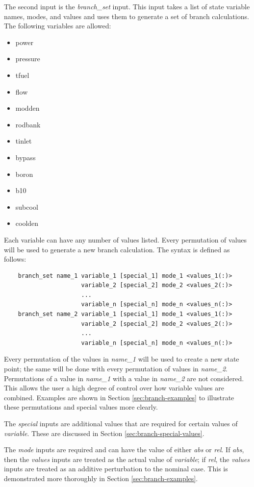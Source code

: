 The second input is the \emph{branch\_set} input.  This input takes a list of state variable names, modes, and values and uses them to generate a set of branch calculations.  The following variables are allowed:
\begin{itemize}[noitemsep]
    \item power
    \item pressure
    \item tfuel
    \item flow
    \item modden
    \item rodbank
    \item tinlet
    \item bypass
    \item boron
    \item b10
    \item subcool
    \item coolden
\end{itemize}

Each variable can have any number of values listed.  Every permutation of values will be used to generate a new branch calculation.  The syntax is defined as follows:
\begin{verbatim}
    branch_set name_1 variable_1 [special_1] mode_1 <values_1(:)>
                      variable_2 [special_2] mode_2 <values_2(:)>
                      ...
                      variable_n [special_n] mode_n <values_n(:)>
    branch_set name_2 variable_1 [special_1] mode_1 <values_1(:)>
                      variable_2 [special_2] mode_2 <values_2(:)>
                      ...
                      variable_n [special_n] mode_n <values_n(:)>
\end{verbatim}
Every permutation of the values in \emph{name\_1} will be used to create a new state point; the same will be done with every permutation of values in \emph{name\_2}.  Permutations of a value in \emph{name\_1} with a value in \emph{name\_2} are not considered.  This allows the user a high degree of control over how variable values are combined.  Examples are shown in Section \ref{sec:branch-examples} to illustrate these permutations and special values more clearly.

The \emph{special} inputs are additional values that are required for certain values of \emph{variable}.  These are discussed in Section \ref{sec:branch-special-values}.

The \emph{mode} inputs are required and can have the value of either \emph{abs} or \emph{rel}.  If \emph{abs}, then the \emph{values} inputs are treated as the actual value of \emph{variable}; if \emph{rel}, the \emph{values} inputs are treated as an additive perturbation to the nominal case.  This is demonstrated more thoroughly in Section \ref{sec:branch-examples}.

